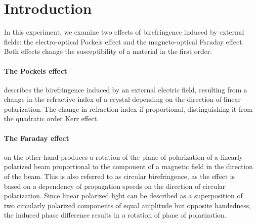 \section{Introduction}
In this experiment, we examine two effects of birefringence induced by 
external fields: the electro-optical Pockels effect and the magneto-optical 
Faraday effect. Both effects change the susceptibility of a material 
in the first order. 

\paragraph{The Pockels effect} describes the birefringence induced by
an external electric field, resulting from a change in the refractive index 
of a crystal depending on the direction of linear polarization. The change 
in refraction index if proportional, distinguishing it from the quadratic order 
Kerr effect.

\paragraph{The Faraday effect} on the other hand produces a rotation 
of the plane of polarization of a linearly polarized beam proportional 
to the component of a magnetic field in the direction of the beam. This 
is also referred to as circular birefringence, as the effect is based 
on a dependency of propagation speeds on the direction of circular 
polarization. Since linear polarized light can be described as a 
superposition of two circularly polarized components of equal amplitude 
but opposite handedness, the induced phase difference results in a 
rotation of plane of polarization. 
